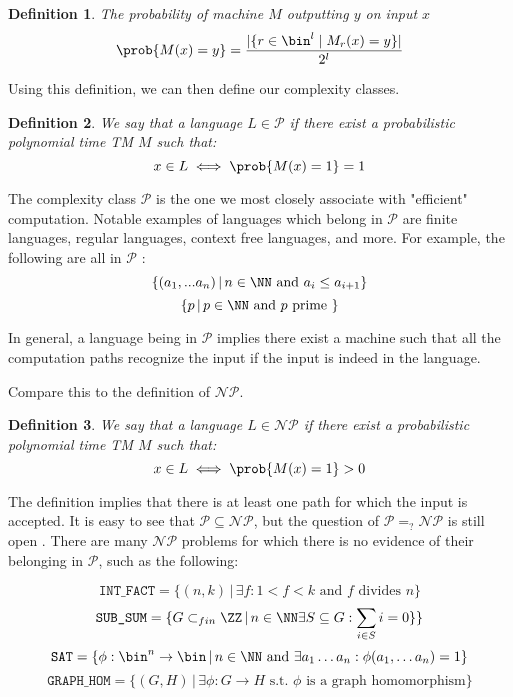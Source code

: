 \documentclass{article}
\newtheorem{definition}{Definition}
\begin{document}
\begin{definition} The probability of machine $M$ outputting $y$ on input $x$
\[ \prob{M(x) = y} = \frac{|\{r \in \bin^{l} \mid M_r(x) = y \}|}{2^{l}}\]
\end{definition}

Using this definition, we can then define our complexity classes. 

\begin{definition}
We say that a language $L \in \mathcal{P}$ if there exist a probabilistic polynomial time TM $M$ such that:
\[x \in L \iff \prob{M(x) = 1} = 1\]
\end{definition}

The complexity class $\mathcal{P}$ is the one we most closely associate with "efficient" computation. Notable examples of languages which belong in $\mathcal{P}$ are finite languages, regular languages, context free languages, and more. For example, the following are all in $\mathcal{P}$ : 
\[ \{(a_1, ... a_n) \, | \, n \in \NN \text{ and } a_i \leq a_{i+1} \}\]
\[ \{ p \,|\, p \in \NN \text{ and } p \text{ prime } \}\]

In general, a language being in $\mathcal{P}$ implies there exist a machine such that all the computation paths recognize the input if the input is indeed in the language. \par

Compare this to the definition of $\mathcal{NP}$.

\begin{definition}
We say that a language $L \in \mathcal{NP}$ if there exist a probabilistic polynomial time TM $M$ such that:
\[x \in L \iff \prob{M(x) = 1} > 0\]
\end{definition}

The definition implies that there is at least one path for which the input is accepted. It is easy to see that $\mathcal{P} \subseteq \mathcal{NP}$, but the question of $\mathcal{P} =_? \mathcal{NP}$ is still open \cite{cookComplexityTheoremprovingProcedures1971} \cite{jaffeMillenniumGrandChallenge2006}. There are many $\mathcal{NP}$ problems for which there is no evidence of their belonging in $\mathcal{P}$, such as the following:

\[ \texttt{INT\_FACT} = \{ (n, k) \, | \, \exists f : 1 < f < k \text { and } f \text{ divides } n\}\]
\[ \texttt{SUB\_SUM} = \{ G \subset_{fin} \ZZ \, | \, n \in \NN \exists S \subseteq G : \sum_{i \in S} i = 0  \} \}\]
\[ \texttt{SAT} = \{ \phi : \bin^n \to \bin \, | \, n \in \NN \text{ and } \exists a_1 \dots a_n : \phi(a_1, \dots a_n) = 1 \} \]
\[ \texttt{GRAPH\_HOM} = \{ (G, H) \, | \, \exists \phi : G \to H \text{ s.t. $\phi$ is a graph homomorphism} \}\]
\end{document}
